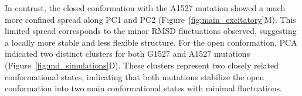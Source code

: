 In contrast, the closed conformation with the A1527 mutation showed a much more confined spread along PC1 and PC2 (Figure~\ref{fig:main_excitatory}M). This limited spread corresponds to the minor RMSD fluctuations observed, suggesting a locally more stable and less flexible structure. 
For the open conformation, PCA indicated two distinct clusters for both G1527 and A1527 mutations (Figure~\ref{fig:md_simulations}D). These clusters represent two closely related conformational states, indicating that both mutations stabilize the open conformation into two main conformational states with minimal fluctuations. 
